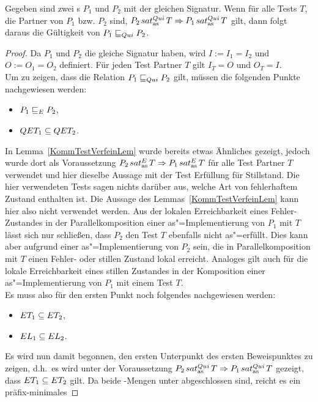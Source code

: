 \begin{Lem}
  \label{StilleTestVerfeinLem}
  Gegeben sind zwei \MEIO{}s $P_1$ und $P_2$ mit der gleichen Signatur. Wenn
  für alle Tests $T$, die Partner von $P_1$ bzw. $P_2$ sind, $P_2\hspace{0.05cm}sat_\mathrm{as}^{Qui}\hspace{0.05cm} T
  \Rightarrow P_1\hspace{0.05cm}sat_\mathrm{as}^{Qui}\hspace{0.05cm} T$ gilt, dann folgt daraus die Gültigkeit von
  $P_1 \sqsubseteq  _{Qui} P_2$.
\end{Lem}
\begin{proof}
  Da $P_1$ und $P_2$ die gleiche Signatur haben, wird $I:=I_1=I_2$ und
  $O:=O_1=O_2$ definiert. Für jeden Test Partner $T$ gilt $I_T=O$ und
  $O_T=I$.\\
  Um zu zeigen, dass die Relation $P_1 \sqsubseteq  _{Qui} P_2$ gilt, müssen die folgenden
  Punkte nachgewiesen werden:
  \begin{itemize}
    \item $P_1 \sqsubseteq  _E P_2$,
    \item $QET _1\subseteq QET _2$.
  \end{itemize}
  In Lemma~\ref{KommTestVerfeinLem} wurde bereits etwas Ähnliches gezeigt,
  jedoch wurde dort als Voraussetzung $P_2\hspace{0.05cm}sat_\mathrm{as}^E\hspace{0.05cm} T\Rightarrow P_1\hspace{0.05cm}sat_\mathrm{as}^E\hspace{0.05cm} T$
  für alle Test Partner $T$ verwendet und hier dieselbe Aussage mit der Test
  Erfüllung für Stillstand. Die hier verwendeten Tests sagen nichts darüber
  aus, welche Art von fehlerhaftem Zustand enthalten ist. Die Aussage des
  Lemmas~\ref{KommTestVerfeinLem} kann hier also nicht verwendet werden. Aus
  der lokalen Erreichbarkeit eines Fehler-Zustandes in der Parallelkomposition
  einer as"=Implementierung von $P_1$ mit $T$ lässt sich nur schließen, dass
  $P_2$ den Test $T$ ebenfalls nicht as"=erfüllt. Dies kann aber aufgrund einer
  as"=Implementierung von $P_2$ sein, die in Parallelkomposition mit $T$ einen
  Fehler- oder stillen Zustand lokal erreicht. Analoges gilt auch für die
  lokale Erreichbarkeit eines stillen Zustandes in der Komposition einer
  as"=Implementierung von $P_1$ mit einem Test $T$.\\
  Es muss also für den ersten Punkt noch folgendes nachgewiesen werden:
  \begin{itemize}
    \item $ET _1\subseteq ET _2$,
    \item $EL _1\subseteq EL _2$.
  \end{itemize}
  Es wird nun damit begonnen, den ersten Unterpunkt des ersten Beweispunktes zu
  zeigen, d.h.\ es wird unter der Voraussetzung $P_2\hspace{0.05cm}sat_\mathrm{as}^{Qui}\hspace{0.05cm} T\Rightarrow
  P_1\hspace{0.05cm}sat_\mathrm{as}^{Qui}\hspace{0.05cm} T$ gezeigt, dass $ET _1\subseteq ET _2$ gilt. Da beide
  \ET{}-Mengen unter \cont{} abgeschlossen sind, reicht es ein präfix-minimales

\end{proof}
